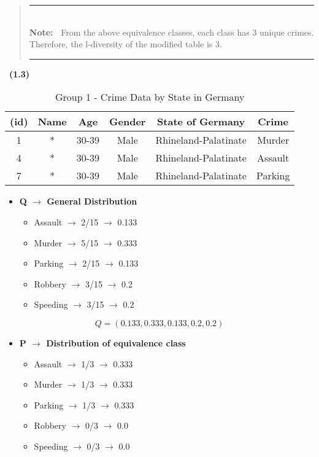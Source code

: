 \documentclass[a4 paper]{article}
\newlength{\Lnote}
\newcommand{\notte}[1]
     {\addtolength{\leftmargini}{4em}
        \settowidth{\Lnote}{\textbf{Note:~}}
        \begin{quote}
            \rule{\dimexpr\textwidth-2\leftmargini}{1pt}\\
                        \mbox{}\hspace{-\Lnote}\textbf{Note:~}%
                                            #1\\[-0.5ex] 
            \rule{\dimexpr\textwidth-2\leftmargini}{1pt}
        \end{quote}
        \addtolength{\leftmargini}{-4em}}
\numberwithin{equation}{section}
\newcommand{\subproblem}[1]{~\newline\textbf{(#1)}}
\newcommand{\0}{\mathbf{0}}
\begin{document}
\notte{From the above equivalence classes, each class has 3 unique crimes. Therefore, the l-diversity of the modified table is 3.}

\pagebreak

\subproblem{1.3}

\begin{table}[H]
    \centering
    \caption{Group 1 - Crime Data by State in Germany}
    \label{tab:crime_data-1-t-closeness}
    \begin{tabular}{cccccc}
        \toprule
        \textbf{(id)} & \textbf{Name} & \textbf{Age} & \textbf{Gender} & \textbf{State of Germany} & \textbf{Crime} \\ \midrule
        1  & *  & 30-39  & Male   & Rhineland-Palatinate   & Murder   \\ \midrule
        4  & *  & 30-39  & Male   & Rhineland-Palatinate   & Assault  \\ \midrule
        7  & *  & 30-39  & Male   & Rhineland-Palatinate   & Parking  \\ \bottomrule
    \end{tabular}
\end{table}

\begin{itemize}
  \item \textbf{Q $\rightarrow$ General Distribution}
  \begin{itemize}
    \item Assault $\rightarrow$ 2/15 $\rightarrow$ 0.133
    \item Murder $\rightarrow$ 5/15 $\rightarrow$ 0.333
    \item Parking $\rightarrow$ 2/15 $\rightarrow$ 0.133
    \item Robbery $\rightarrow$ 3/15 $\rightarrow$ 0.2
    \item Speeding $\rightarrow$ 3/15 $\rightarrow$ 0.2
  \end{itemize}
\end{itemize}

$$
  Q = (0.133, 0.333, 0.133, 0.2, 0.2)
$$

\begin{itemize}
  \item \textbf{P $\rightarrow$ Distribution of equivalence class}
  \begin{itemize}
    \item Assault $\rightarrow$ 1/3 $\rightarrow$ 0.333
    \item Murder $\rightarrow$ 1/3 $\rightarrow$ 0.333
    \item Parking $\rightarrow$ 1/3 $\rightarrow$ 0.333
    \item Robbery $\rightarrow$ 0/3 $\rightarrow$ 0.0
    \item Speeding $\rightarrow$ 0/3 $\rightarrow$ 0.0
  \end{itemize}
\end{itemize}
\end{document}
